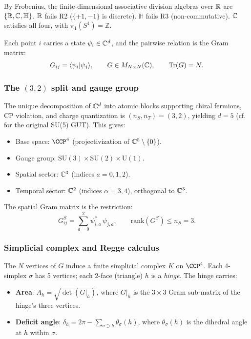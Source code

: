 \noindent
By Frobenius, the finite-dimensional associative division algebras over
$\mathbb{R}$ are $\{\mathbb{R}, \mathbb{C}, \mathbb{H}\}$. $\mathbb{R}$
fails R2 ($\{+1,-1\}$ is discrete). $\mathbb{H}$ fails R3
(non-commutative). $\mathbb{C}$ satisfies all four, with
$\pi_1(S^1) = \mathbb{Z}$.

Each point $i$ carries a state $\psi_i \in \mathbb{C}^d$, and the
pairwise relation is the Gram matrix:
\begin{equation}
G_{ij} = \langle \psi_i | \psi_j \rangle, \qquad
G \in M_{N \times N}(\mathbb{C}), \qquad
\mathrm{Tr}(G) = N.
\end{equation}

\subsubsection{The $(3,2)$ split and gauge group}

The unique decomposition of $\mathbb{C}^d$ into atomic blocks supporting
chiral fermions, CP violation, and charge quantization is
$(n_S, n_T) = (3, 2)$, yielding $d = 5$ 
(cf.\ \cite{GeorgiGlashow} for the original SU(5) GUT). This gives:

\begin{itemize}
\item Base space: $\CCP^4$ (projectivization of
  $\mathbb{C}^5 \setminus \{0\}$).
\item Gauge group: $\mathrm{SU}(3) \times \mathrm{SU}(2) \times
  \mathrm{U}(1)$.
\item Spatial sector: $\mathbb{C}^3$ (indices $a = 0, 1, 2$).
\item Temporal sector: $\mathbb{C}^2$ (indices $\alpha = 3, 4$),
  orthogonal to $\mathbb{C}^3$.
\end{itemize}

The spatial Gram matrix is the restriction:
\begin{equation}
G^S_{ij} = \sum_{a=0}^{2} \psi^*_{i,a}\, \psi_{j,a}, \qquad
\mathrm{rank}(G^S) \leq n_S = 3.
\label{eq:GS}
\end{equation}

\subsubsection{Simplicial complex and Regge calculus}

The $N$ vertices of $G$ induce a finite simplicial complex $K$ on
$\CCP^4$. Each 4-simplex $\sigma$ has 5 vertices; each 2-face
(triangle) $h$ is a \emph{hinge}. The hinge carries:

\begin{itemize}
\item \textbf{Area}: $A_h = \sqrt{\det(G|_h)}$, where $G|_h$ is the
  $3 \times 3$ Gram sub-matrix of the hinge's three vertices.
\item \textbf{Deficit angle}: $\delta_h = 2\pi -
  \sum_{\sigma \supset h} \theta_\sigma(h)$, where $\theta_\sigma(h)$
  is the dihedral angle at $h$ within $\sigma$.
\end{itemize}

